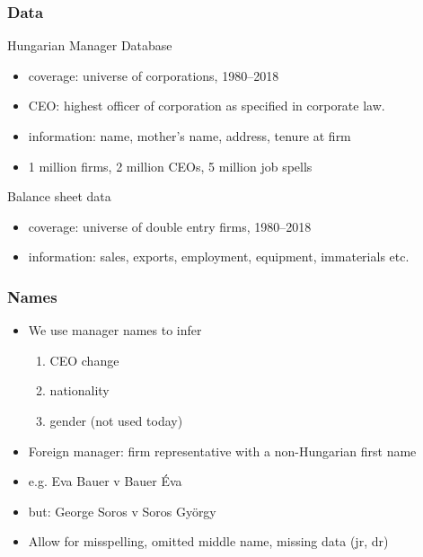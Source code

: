 \documentclass[aspectratio=43,compress,mathserif]{beamer}
\newcounter{ora}
\begin{document}
\begin{frame}\frametitle{Data}\hypertarget{Data}{}
\begin{block}{Hungarian Manager Database}\hypertarget{Hungarian Manager Database}{}
\begin{itemize}
\item coverage: universe of corporations, 1980--2018

\item CEO: highest officer of corporation as specified in corporate law.
\item information: name, mother's name, address, tenure at firm

\item 1 million firms, 2 million CEOs, 5 million job spells


\end{itemize}
\end{block}
\begin{block}{Balance sheet data}\hypertarget{Balance sheet data}{}
\begin{itemize}
\item coverage: universe of double entry firms, 1980--2018

\item information: sales, exports, employment, equipment, immaterials etc.


\end{itemize}
\end{block}
\end{frame}



\begin{frame}\frametitle{Names}\hypertarget{Names}{}
\begin{itemize}
\item We use manager names to infer 
\begin{enumerate}\setcounter{enumi}{0}
\item CEO change

\item nationality

\item gender (not used today)
\end{enumerate}

\item Foreign manager: firm representative with a non-Hungarian first name
\item e.g. Eva Bauer v Bauer Éva
\item but: George Soros v Soros György

\item Allow for misspelling, omitted middle name, missing data (jr, dr)


\end{itemize}
\end{frame}
\end{document}
